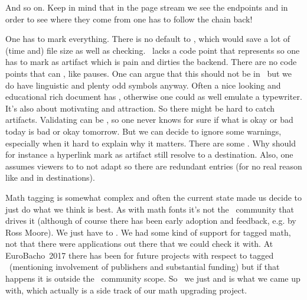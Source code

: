 And so on. Keep in mind that in the page stream we see the endpoints and in order
to see where they come from one has to follow the chain back!

\stoptitle

\starttitle[title=Annoyances]

\startitemize
\startitem
    One has to mark everything. There is no default to ,
    which would save a lot of (time and) file size as well as checking.
\stopitem
\startitem
    \UNICODE\ lacks a code point that represents  so one has to mark  as artifact which is pain and dirties the backend.
\stopitem
\startitem
    There are no code points that can , like
    pauses. One can argue that this should not be in \UNICODE\ but we do have
    linguistic and plenty odd symbols anyway.
\stopitem
\startitem
    Often a nice looking and educational rich document has , otherwise one could as well emulate a typewriter. It's also about
    motivating and attraction. So there might be hard to catch artifacts.
\stopitem
\startitem
    Validating can be , so one never knows for sure if what is
    okay or bad today is bad or okay tomorrow. But we can decide to ignore some
    warnings, especially when it hard to explain why it matters.
\stopitem
\startitem
    There are some . Why should for instance a hyperlink
    mark as artifact still resolve to a destination. Also, one assumes viewers to
    to not adapt so there are redundant entries (for no real reason like
     and   in destinations).
\stopitem
\stopitemize

\starttitle[title=Math]

\startitemize
\startitem
    Math tagging is somewhat complex and often  the
    current state made us decide to just do what we think is best.
\stopitem
\startitem
    As with math fonts it's not the \TEX\ community that drives it (although of
    course there has been early adoption and feedback, e.g. by Ross Moore). We just
    have to .
\stopitem
\startitem
    We  had some kind of support for tagged math, not that
    there were applications out there that we could check it with.
\stopitem
\startitem
    At EuroBacho\TEX\ 2017 there has been  for future
    projects with respect to tagged \PDF\ (mentioning involvement of publishers
    and substantial funding) but if that happens it is outside the \CONTEXT\
    community scope.
\stopitem
\startitem
    So \unknown\ we just  and  is what
    we came up with, which actually is a side track of our math upgrading
    project.
\stopitem

